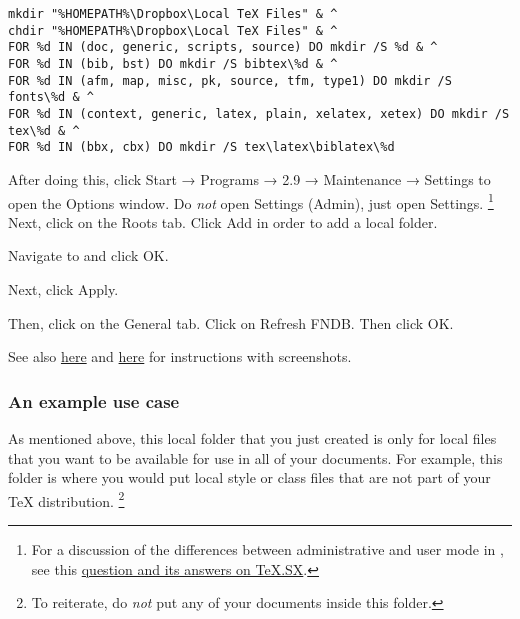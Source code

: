 \begin{listing}[htbp]
	\centering
	\begin{verbatim}
mkdir "%HOMEPATH%\Dropbox\Local TeX Files" & ^
chdir "%HOMEPATH%\Dropbox\Local TeX Files" & ^
FOR %d IN (doc, generic, scripts, source) DO mkdir /S %d & ^
FOR %d IN (bib, bst) DO mkdir /S bibtex\%d & ^
FOR %d IN (afm, map, misc, pk, source, tfm, type1) DO mkdir /S fonts\%d & ^
FOR %d IN (context, generic, latex, plain, xelatex, xetex) DO mkdir /S tex\%d & ^
FOR %d IN (bbx, cbx) DO mkdir /S tex\latex\biblatex\%d
	\end{verbatim}
	\caption{Make a TDS-compliant directory in Dropbox for  on Windows}
	\label{lst:Windows-make-local-texmf-MiKTeX}
\end{listing}

After doing this, click Start → Programs →  2.9 → Maintenance → Settings to open the  Options window.
Do \emph{not} open Settings (Admin), just open Settings.%
\footnote{%
For a discussion of the differences between administrative and user mode in , see this \href{http://tex.stackexchange.com/q/67712/32888}{question and its answers on TeX.SX}.%
}
Next, click on the Roots tab.
Click Add in order to add a local  folder.

Navigate to  and click OK.

Next, click Apply.

Then, click on the General tab.
Click on Refresh FNDB.
Then click OK.

See also \href{http://docs.miktex.org/manual/localadditions.html#id584820}{here} and \href{http://docs.miktex.org/manual/configuring.html#fndbupdate}{here} for instructions with screenshots.

\subsubsection{An example use case}
\label{subsubsec:an-example-use-case}

As mentioned above, this local  folder that you just created is only for local files that you want to be available for use in all of your  documents.
For example, this  folder is where you would put local style or class files that are not part of your \TeX{} distribution.%
\footnote{%
To reiterate, do \emph{not} put any of your  documents inside this  folder.%
}

